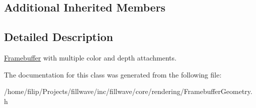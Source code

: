 \subsection*{Additional Inherited Members}


\subsection{Detailed Description}
\hyperlink{classflw_1_1flc_1_1Framebuffer}{Framebuffer} with multiple color and depth attachments. 

The documentation for this class was generated from the following file\+:\begin{DoxyCompactItemize}
\item 
/home/filip/\+Projects/fillwave/inc/fillwave/core/rendering/Framebuffer\+Geometry.\+h\end{DoxyCompactItemize}
